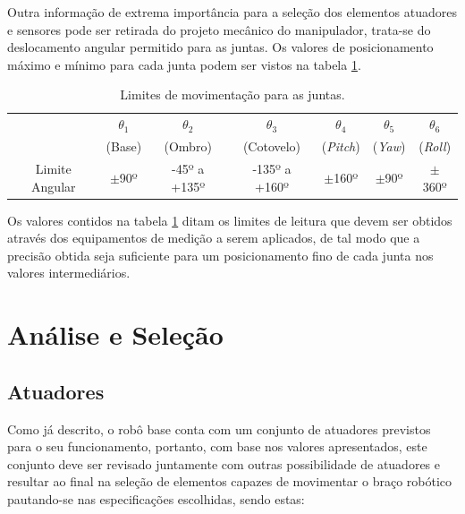 Outra informação de extrema importância para a seleção dos elementos atuadores e 
sensores pode ser retirada do projeto mecânico do manipulador, trata-se do 
deslocamento angular permitido para as juntas. Os valores de 
posicionamento máximo e mínimo para cada junta podem ser vistos na 
tabela \ref{tab:Tabela-Alcance}.

\begin{table}[h]
\begin{centering}    
    
\begin{tabular}{|c|c|c|c|c|c|c|}
    \hline
    & $\theta_1$ & $\theta_2$ & $\theta_3$ & $\theta_4$ & $\theta_5$ & $\theta_6$ \tabularnewline
    & (Base) & (Ombro) & (Cotovelo) & (\textit{Pitch}) & (\textit{Yaw}) & (\textit{Roll}) \tabularnewline
    \hline
    \hline
    Limite Angular & $\pm$90º & -45º a +135º & -135º a +160º & $\pm$160º & $\pm$90º & $\pm$360º\tabularnewline
    \hline
\end{tabular}
    
\caption{Limites de movimentação para as juntas.}
\label{tab:Tabela-Alcance}

\par\end{centering}
\end{table}

Os valores contidos na tabela \ref{tab:Tabela-Alcance} ditam os limites 
de leitura que devem ser obtidos através dos equipamentos de medição a 
serem aplicados, de tal modo que a precisão obtida seja suficiente 
para um posicionamento fino de cada junta nos valores intermediários.

\section{Análise e Seleção}
\label{sec:AnaliseEletro}


\subsection{Atuadores}

Como já descrito, o robô base conta com um conjunto de atuadores 
previstos para o seu funcionamento, portanto, com base nos valores 
apresentados, este conjunto deve ser revisado juntamente com outras 
possibilidade de atuadores e resultar ao final na seleção de elementos 
capazes de movimentar o braço robótico pautando-se nas especificações 
escolhidas, sendo estas: 

